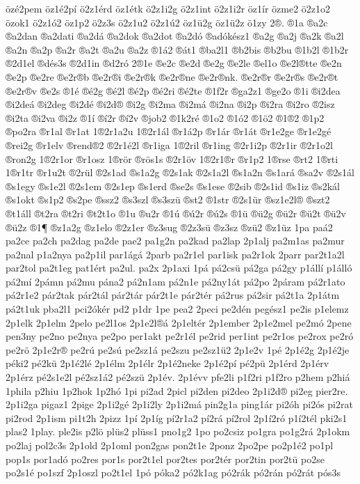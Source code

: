 {özé2pem
öz1é2pí
ö2z1érd
öz1étk
ö2z1i2g
ö2z1int
ö2z1i2r
öz1ír
özme2
ö2z1o2
özok1
ö2z1ó2
öz1p2
ö2z3s
ö2z1u2
ö2z1ú2
öz1ü2g
öz1ü2z
ö1zy
2®.
®1a
®a2c
®a2dan
®a2dati
®a2dá
®a2dok
®a2dot
®a2dó
®adókész1
®a2g
®a2j
®a2k
®a2l
®a2n
®a2p
®a2r
®a2t
®a2u
®a2z
®1á2
®át1
®ba2l1
®b2bis
®b2bu
®1b2l
®1b2r
®2d1el
®dés3s
®2d1in
®d2ró
2®1e
®e2c
®e2d
®e2g
®e2le
®el1o
®e2l®tte
®e2n
®e2p
®e2re
®e2r®b
®e2r®i
®e2r®k
®e2r®ne
®e2r®nk.
®e2r®r
®e2r®s
®e2r®t
®e2r®v
®e2s
®1é
®é2g
®é2l
®é2p
®é2ri
®é2te
®1f2r
®ga2z1
®ge2o
®1i
®i2dea
®i2deá
®i2deg
®i2dé
®i2d®
®i2g
®i2ma
®i2má
®i2na
®i2p
®i2ra
®i2ro
®2isz
®i2ta
®i2va
®i2z
®1í
®í2r
®í2v
®job2
®1k2ré
®1o2
®1ó2
®1ö2
®1®2
®1p2
®po2ra
®r1al
®r1at
1®2r1a2u
1®2r1ál
®r1á2p
®r1ár
®r1át
®r1e2ge
®r1e2gé
®rei2g
®r1elv
®rend®2
®2r1é2l
®r1iga
1®2ril
®r1ing
®2r1i2p
®2r1ir
®2r1o2l
®ron2g
1®2r1or
®r1osz
1®rör
®rös1s
®2r1öv
1®2r1®r
®r1p2
1®rse
®rt2
1®rti
1®r1tr
®r1u2t
®2rül
®2s1ad
®s1a2g
®2s1ak
®2s1a2l
®s1a2n
®s1ará
®sa2v
®2s1ál
®s1egy
®s1e2l
®2s1em
®2s1ep
®s1erd
®se2s
®s1ese
®2sib
®2s1id
®s1iz
®s2kál
®s1okt
®s1p2
®s2pe
®ssz2
®s3szl
®s3szü
®st2
®1str
®2s1ür
®sz1e2l®
®szt2
®t1áll
®t2ra
®t2ri
®t2t1o
®1u
®u2r
®1ú
®ú2r
®ú2s
®1ü
®ü2g
®ü2r
®ü2t
®ü2v
®ü2z
®1¶
®z1a2g
®z1elo
®2z1er
®z3sug
®2z3sü
®z3sz
®zü2
®z1üz
1pa
paá2
pa2ce
pa2ch
pa2dag
pa2de
pae2
pa1g2n
pa2kad
pa2lap
2p1alj
pa2m1as
pa2mur
pa2nal
p1a2nya
pa2p1il
par1ágá
2parb
pa2r1el
par1isk
pa2r1ok
2parr
par2t1a2l
par2tol
pa2t1eg
pat1ért
pa2ul.
pa2x
2p1axi
1pá
pá2csü
pá2ga
pá2gy
p1állí
p1álló
pá2mí
2pámn
pá2mu
pána2
pá2n1am
pá2n1e
pá2ny1át
pá2po
2páram
pá2r1ato
pá2r1e2
pár2tak
pár2tál
pár2tár
pár2t1e
pár2tér
pá2rus
pá2sir
pá2t1a
2p1átm
pá2t1uk
pba2l1
pci2ókér
pd2
p1dr
1pe
pea2
2peci
pe2dén
pegész1
pe2is
p1elemz
2p1elk
2p1elm
2pelo
pe2l1os
2p1e2l®á
2p1eltér
2p1ember
2p1e2mel
pe2mó
2pene
pen3ny
pe2no
pe2nya
pe2po
per1akt
pe2r1él
pe2rid
per1int
pe2r1os
pe2rox
pe2ró
pe2rö
2p1e2r®
pe2rú
pe2sú
pe2sz1á
pe2szu
pe2sz1ü2
2p1e2v
1pé
2p1é2g
2p1é2je
péki2
pé2kü
2p1é2lé
2p1élm
2p1élr
2p1é2neke
2p1é2pí
pé2pü
2p1érd
2p1érv
2p1érz
pé2s1e2l
pé2sz1á2
pé2szü
2p1év.
2p1évv
pfe2li
p1f2ri
p1f2ro
p2hem
p2hiá
1phila
p2hiu
1p2hok
1p2hó
1pi
pi2ad
2picl
pi2den
pi2deo
2p1i2d®
pi2eg
pier2re.
2p1i2ga
pigaz1
2pige
2p1i2gé
2p1i2ly
2p1i2má
pin2g1a
ping1ár
pi2óh
pi2ós
pi2rat
pi2rod
2p1ism
pi1t2h
2pizz
1pí
2p1íg
pí2r1a2
pí2rá
pí2rol
2p1í2ró
p1í2tél
pki2s1
plas2
1play.
ple2is
p2lö
plüs2
plüss1
pno1g2
1po
po2csiz
po1gra
po1g2rá
2p1okm
po2laj
pol2c3s
2p1old
2p1oml
pon2gas
pon2t1e
2ponz
2po2pe
po2p1é2
po1pl
pop1s
por1adó
po2res
por1s
por2t1el
por2tes
por2tér
por2tin
por2tü
po2se
po2s1é
po1szf
2p1oszl
po2t1el
1pó
póka2
pó2k1ag
pó2rák
pó2rán
pó2rát
pós3s
}
